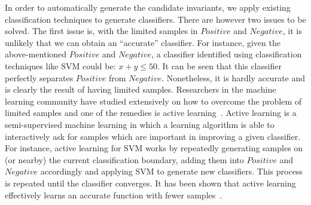 In order to automatically generate the candidate invariants, we apply existing classification techniques to generate classifiers. There are however two issues to be solved. The first issue is, with the limited samples in $\mathit{Positive}$ and $\mathit{Negative}$, it is unlikely that we can obtain an ``accurate'' classifier. For instance, given the above-mentioned $\mathit{Positive}$ and $\mathit{Negative}$, a classifier identified using classification techniques like SVM could be: $x+y \leq 50$. It can be seen that this classifier perfectly separates $\mathit{Positive}$ from $\mathit{Negative}$. Nonetheless, it is hardly accurate and is clearly the result of having limited samples. Researchers in the machine learning community have studied extensively on how to overcome the problem of limited samples and one of the remedies is active learning~\cite{DBLP:series/synthesis/2012Settles}. Active learning is a semi-supervised machine learning in which a learning algorithm is able to interactively ask for samples which are important in improving a given classifier. For instance, active learning for SVM works by repeatedly generating samples on (or nearby) the current classification boundary, adding them into $\mathit{Positive}$ and $\mathit{Negative}$ accordingly and applying SVM to generate new classifiers. This process is repeated until the classifier converges. It has been shown that active learning effectively learns an accurate function with fewer samples~\cite{DBLP:conf/icml/SchohnC00}.

